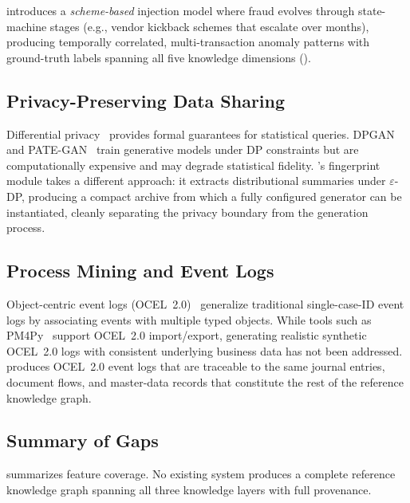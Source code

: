 \system{} introduces a \emph{scheme-based} injection model where fraud
evolves through state-machine stages (e.g., vendor kickback schemes that
escalate over months), producing temporally correlated, multi-transaction
anomaly patterns with ground-truth labels spanning all five knowledge
dimensions ().

\subsection{Privacy-Preserving Data Sharing}
\label{sec:rw_privacy}

Differential privacy~\citep{dwork2006calibrating} provides formal
guarantees for statistical queries.  DPGAN~\citep{xie2018differentially}
and PATE-GAN~\citep{jordon2019pate} train generative models under DP
constraints but are computationally expensive and may degrade statistical
fidelity.  \system{}'s fingerprint module takes a different approach:
it extracts distributional summaries under $\varepsilon$-DP,
producing a compact archive from which a fully configured generator
can be instantiated, cleanly separating the privacy boundary from the
generation process.

\subsection{Process Mining and Event Logs}
\label{sec:rw_process_mining}

Object-centric event logs (OCEL~2.0)~\citep{ghahfarokhi2021ocel}
generalize traditional single-case-ID event logs by associating events
with multiple typed objects.  While tools such as
PM4Py~\citep{berti2019process} support OCEL~2.0 import/export,
generating realistic synthetic OCEL~2.0 logs with consistent underlying
business data has not been addressed.  \system{} produces OCEL~2.0
event logs that are traceable to the same journal entries, document
flows, and master-data records that constitute the rest of the reference
knowledge graph.

\subsection{Summary of Gaps}
\label{sec:rw_summary}

 summarizes feature coverage.  No existing
system produces a complete reference knowledge graph spanning all three
knowledge layers with full provenance.

